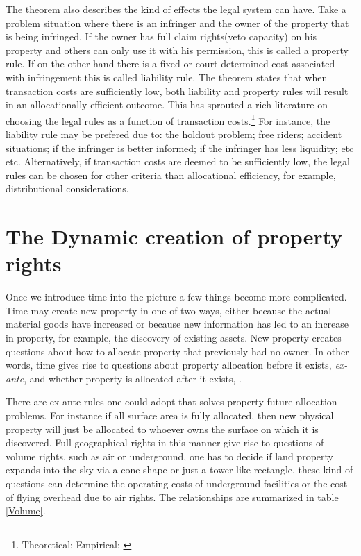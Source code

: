 \documentclass[12pt]{article}
\numberwithin{equation}{section}
\begin{document}
The theorem also describes the kind of effects the legal system can have. Take a problem situation where there is an infringer and the owner of the property that is being infringed. If the owner has full claim rights(veto capacity) on his property and others can only use it with his permission, this is called a property rule. If on the other hand there is a fixed or court determined cost associated with infringement this is called liability rule. The theorem states that when transaction costs are sufficiently low, both liability and property rules will result in an allocationally efficient outcome. This has sprouted a rich literature on choosing the legal rules as a function of transaction costs.\footnote{Theoretical: \cite{calabresi1972property} Empirical: \cite{kaplow1995property}} For instance, the liability rule may be prefered due to: the holdout problem; free riders; accident situations; if the infringer is better informed; if the infringer has less liquidity; etc etc. Alternatively, if transaction costs are deemed to be sufficiently low, the legal rules can be chosen for other criteria than allocational efficiency, for example, distributional considerations.



\newpage

\section{The Dynamic creation of property rights}

Once we introduce time into the picture a few things become more complicated. Time may create new property in one of two ways, either because the actual material goods have increased or because new information has led to an increase in property, for example, the discovery of existing assets. New property creates questions about how to allocate property that previously had no owner. In other words, time gives rise to questions about property allocation before it exists, \textit{ex-ante}, and whether property is allocated after it exists, .

There are ex-ante rules one could adopt that solves property future allocation problems.  For instance if all surface area is fully allocated, then new physical property will just be allocated to whoever owns the surface on which it is discovered. Full geographical rights in this manner give rise to questions of volume rights, such as air or underground, one has to decide if land property expands into the sky via a cone shape or just a tower like rectangle, these kind of questions can determine the operating costs of underground facilities or the cost of flying overhead due to air rights. The relationships are summarized in table \ref{Volume}.
\end{document}

